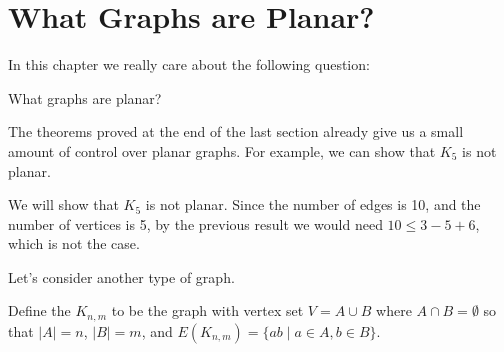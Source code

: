 \documentclass[a4paper]{scrreprt}
\begin{document}
\section{What Graphs are Planar?}

In this chapter we really care about the following question:
\begin{center}
	What graphs are planar?
\end{center}

The theorems proved at the end of the last section already give us a small amount of control over planar graphs. For example, we can show that $K_5$ is not planar.

\begin{example}
	We will show that $K_5$ is not planar.
	Since the number of edges is 10, and the number of vertices is 5, by the previous result we would need $10 \leq 3 - 5 + 6$, which is not the case.
\end{example}

Let's consider another type of graph.

\begin{definition}
	Define the  $K_{n, m}$ to be the graph with vertex set $V = A \cup B$ where $A \cap B = \emptyset$ so that $|A| = n$, $|B| = m$, and $E(K_{n, m}) = \{ab \mid a \in A, b \in B\}$.
\end{definition}
\end{document}
